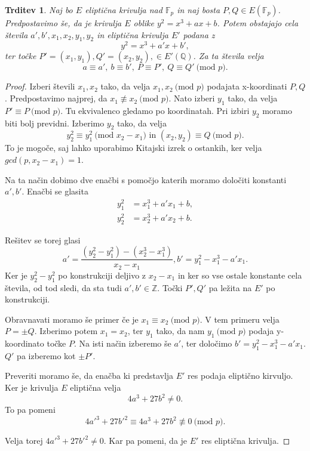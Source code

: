\documentclass[12pt,a4paper,twoside]{article}
\theoremstyle{definition} %
\theoremstyle{plain} %
\newtheorem{trditev}[definicija]{Trditev}
\numberwithin{equation}{section}  %
\newcommand{\Z}{\mathbb Z}
\newcommand{\Q}{\mathbb Q}
\newcommand{\F}{\mathbb F}
\newcommand{\E}[1]{E({#1})}
\newcommand{\MOD}[1]{\ \text{(mod }{#1}\text{)}}
\begin{document}
\begin{trditev}
\label{trd:5.6}
Naj bo $E$ eliptična krivulja nad $\F_p$ in naj bosta $P,Q \in \E{\F_p}$. Predpostavimo še, da je krivulja $E$ oblike $y^2=x^3+ax+b$. Potem obstajajo cela števila
$a',b',x_1,x_2,y_1,y_2$ in eliptična krivulja $E'$ podana z
$$y^2=x^3+a'x+b',$$
ter točke $P'=(x_1,y_1),Q'=(x_2,y_2), \in E'(\Q)$.
Za ta števila velja
$$a\equiv a',\ b \equiv b',\ P \equiv P',\ Q \equiv Q' \MOD{p}.$$

\end{trditev}

\begin{proof}
Izberi števili $x_1,x_2$ tako, da velja $x_1,x_2 \MOD{p}$ podajata x-koordinati $P,Q$. Predpostavimo najprej, da $x_1 \not \equiv x_2 \MOD{p}$. Nato izberi $y_1$ tako, da velja
$P' \equiv P \MOD{p}$. Tu ekvivalenco gledamo po koordinatah. Pri izbiri $y_2$ moramo biti bolj previdni. Izberimo $y_2$ tako, da velja
$$y_2^2\equiv y_1^2 \MOD{x_2-x_1} \text{ in } (x_2,y_2) \equiv Q \MOD{p}.$$
To je mogoče, saj lahko uporabimo Kitajski izrek o ostankih, ker velja $gcd(p,x_2-x_1) = 1$.

Na ta način dobimo dve enačbi s pomočjo katerih moramo določiti konstanti $a',b'$.
Enačbi se glasita
\begin{align}
y_1^2&{}=x_1^3+a'x_1+b, \nonumber  \\
y_2^2&{}=x_2^3+a'x_2+b. \nonumber
\end{align}

Rešitev se torej glasi
$$a' = \frac{(y_2^2-y_1^2)-(x_2^3-x_1^3)}{x_2-x_1}, b' = y_1^2-x_1^3-a'x_1.$$
Ker je $y_2^2-y_1^2$ po konstrukciji deljivo z $x_2-x_1$ in ker so vse ostale konstante cela števila, od tod sledi, da sta tudi $a',b' \in \Z$. Točki $P',Q'$ pa ležita na $E'$ po konstrukciji.

Obravnavati moramo še primer če je $x_1 \equiv x_2 \MOD{p}$. V tem primeru velja $P = \pm Q$. Izberimo potem $x_1 = x_2$, ter $y_1$ tako, da nam $y_1 \MOD{p}$ podaja y-koordinato točke $P$. Na isti način izberemo še $a'$, ter določimo $b' = y_1^2-x_1^3-a'x_1$. $Q'$ pa izberemo kot $\pm P'$.

Preveriti moramo še, da enačba ki predstavlja $E'$ res podaja eliptično kirvuljo. Ker je krivulja $E$ eliptična velja
$$4a^3+27b^2 \neq 0.$$
To pa pomeni
$$4a'^3+27b'^2 \equiv 4a^3+27b^2 \not \equiv 0 \MOD{p}.$$

Velja torej $4a'^3+27b'^2 \neq 0$. Kar pa pomeni, da je $E'$ res eliptična krivulja.
\end{proof}
\end{document}
